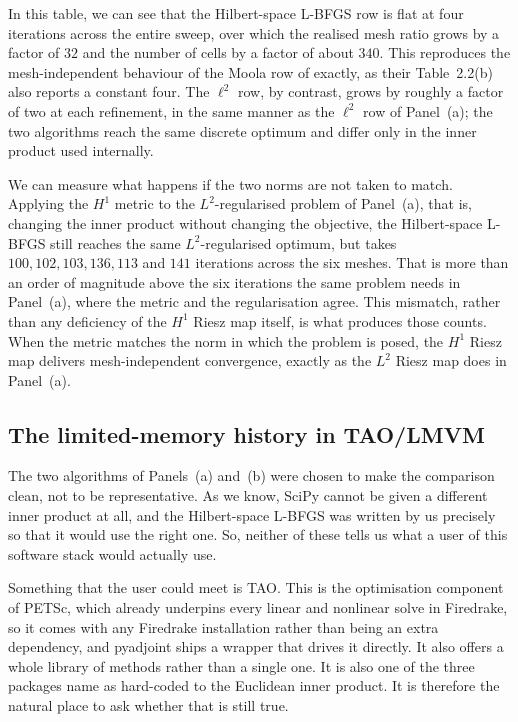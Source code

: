 \documentclass[a4paper,11pt]{article}
\theoremstyle{spacedplain} \newtheorem{theorem}[counter]{Theorem} \newtheorem{lemma}[counter]{Lemma} \newtheorem{prop}[counter]{Proposition} \newtheorem{cor}[counter]{Corollary}
\theoremstyle{spaceddefinition} \newtheorem{defn}[counter]{Definition} \newtheorem{example}[counter]{Example} \newtheorem{remark}[counter]{Remark}
\begin{document}
In this table, we can see that the Hilbert-space L-BFGS row is flat at four iterations across the entire sweep, over which the realised mesh ratio grows by a factor of $32$ and the number of cells by a factor of about $340$. This reproduces the mesh-independent behaviour of the Moola row of \citet{shfp2017} exactly, as their Table~2.2(b) also reports a constant four. The $\ell^{2}$ row, by contrast, grows by roughly a factor of two at each refinement, in the same manner as the $\ell^{2}$ row of Panel~(a); the two algorithms reach the same discrete optimum and differ only in the inner product used internally.

We can measure what happens if the two norms are not taken to match. Applying the $H^{1}$ metric to the $L^{2}$-regularised problem of Panel~(a), that is, changing the inner product without changing the objective, the Hilbert-space L-BFGS still reaches the same $L^{2}$-regularised optimum, but takes $100, 102, 103, 136, 113$ and $141$ iterations across the six meshes. That is more than an order of magnitude above the six iterations the same problem needs in Panel~(a), where the metric and the regularisation agree. This mismatch, rather than any deficiency of the $H^{1}$ Riesz map itself, is what produces those counts. When the metric matches the norm in which the problem is posed, the $H^{1}$ Riesz map delivers mesh-independent convergence, exactly as the $L^{2}$ Riesz map does in Panel~(a).

\subsection{The limited-memory history in TAO/LMVM}
\label{sec:meshdep:tao-revisited}

The two algorithms of Panels~(a) and~(b) were chosen to make the comparison clean, not to be representative. As we know, SciPy cannot be given a different inner product at all, and the Hilbert-space L-BFGS was written by us precisely so that it would use the right one. So, neither of these tells us what a user of this software stack would actually use.

Something that the user could meet is TAO. This is the optimisation component of PETSc, which already underpins every linear and nonlinear solve in Firedrake, so it comes with any Firedrake installation rather than being an extra dependency, and pyadjoint ships a wrapper that drives it directly. It also offers a whole library of methods rather than a single one. It is also one of the three packages \citet[Sect.~2.1]{shfp2017} name as hard-coded to the Euclidean inner product. It is therefore the natural place to ask whether that is still true.
\end{document}
